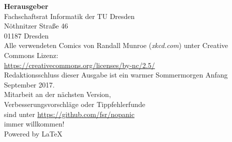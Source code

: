 \newpage
\thispagestyle{empty} %
\color{white}

\begin{minipage}[t][\textheight][b]{.60\textwidth}
\footnotesize
\textbf{Herausgeber} \\
Fachschaftsrat Informatik der TU Dresden\\
Nöthnitzer Straße 46\\
01187 Dresden\\[1\baselineskip]

Alle verwendeten Comics von Randall Munroe (\textit{xkcd.com}) unter Creative Commons Lizenz:\\
\url{https://creativecommons.org/licenses/by-nc/2.5/}\\[1\baselineskip]

Redaktionsschluss dieser Ausgabe ist ein warmer Sommermorgen Anfang September 2017.\\[1\baselineskip]

Mitarbeit an der nächsten Version,\\
Verbesserungsvorschläge oder Tippfehlerfunde\\
sind unter \url{https://github.com/fsr/nopanic}\\
immer willkommen!\\[1\baselineskip]

Powered by \LaTeX
\end{minipage}%
\hspace{.20\textwidth}%
